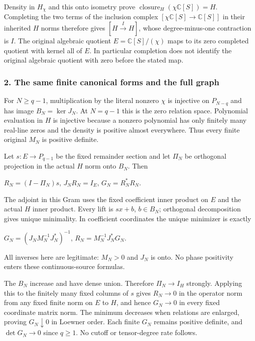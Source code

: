 Density in \(H_\chi\) and this onto isometry prove \(\operatorname{closure}_H(\chi\mathbb C[S])=H\). Completing the two terms of the inclusion complex \([\chi\mathbb C[S]\longrightarrow\mathbb C[S]]\) in their inherited \(H\) norms therefore gives \([H\xrightarrow{I}H]\), whose degree-minus-one contraction is \(I\). The original algebraic quotient \(E=\mathbb C[S]/(\chi)\) maps to its zero completed quotient with kernel all of \(E\). In particular completion does not identify the original algebraic quotient with zero before the stated map.

\subsubsection{2. The same finite canonical forms and the full graph}\label{the-same-finite-canonical-forms-and-the-full-graph}

For \(N\ge q-1\), multiplication by the literal nonzero \(\chi\) is injective on \(P_{N-q}\) and has image \(B_N=\ker J_N\). At \(N=q-1\) this is the zero relation space. Polynomial evaluation in \(H\) is injective because a nonzero polynomial has only finitely many real-line zeros and the density is positive almost everywhere. Thus every finite original \(M_N\) is positive definite.

Let \(s:E\longrightarrow P_{q-1}\) be the fixed remainder section and let \(\Pi_N\) be orthogonal projection in the actual \(H\) norm onto \(B_N\). Then

\(R_N=(I-\Pi_N)s\), \(J_NR_N=I_E\), \(G_N=R_N^*R_N\).

The adjoint in this Gram uses the fixed coefficient inner product on \(E\) and the actual \(H\) inner product. Every lift is \(sx+b\), \(b\in B_N\); orthogonal decomposition gives unique minimality. In coefficient coordinates the unique minimizer is exactly

\(G_N=(J_NM_N^{-1}J_N^*)^{-1}\), \(R_N=M_N^{-1}J_N^*G_N\).

All inverses here are legitimate: \(M_N>0\) and \(J_N\) is onto. No phase positivity enters these continuous-source formulas.

The \(B_N\) increase and have dense union. Therefore \(\Pi_N\longrightarrow I_H\) strongly. Applying this to the finitely many fixed columns of \(s\) gives \(R_N\longrightarrow0\) in the operator norm from any fixed finite norm on \(E\) to \(H\), and hence \(G_N\longrightarrow0\) in every fixed coordinate matrix norm. The minimum decreases when relations are enlarged, proving \(G_N\downarrow0\) in Loewner order. Each finite \(G_N\) remains positive definite, and \(\det G_N\longrightarrow0\) since \(q\ge1\). No cutoff or tensor-degree rate follows.

